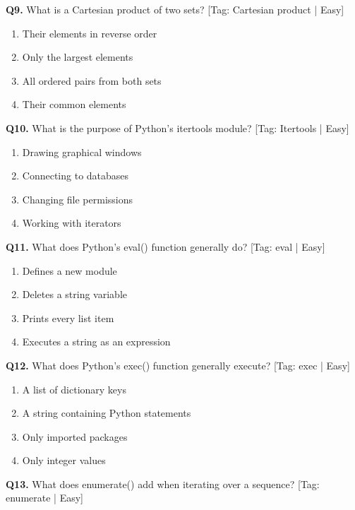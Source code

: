 \noindent\textbf{Q9.} What is a Cartesian product of two sets? \hfill [Tag: Cartesian product | Easy]
\begin{enumerate}[label=(\alph*),topsep=2pt,itemsep=1pt,partopsep=0pt,parsep=0pt]
    \item {Their elements in reverse order}
    \item {Only the largest elements}
    \item {All ordered pairs from both sets}
    \item {Their common elements}
\end{enumerate}
\vspace{2mm}
\noindent\textbf{Q10.} What is the purpose of Python's itertools module? \hfill [Tag: Itertools | Easy]
\begin{enumerate}[label=(\alph*),topsep=2pt,itemsep=1pt,partopsep=0pt,parsep=0pt]
    \item {Drawing graphical windows}
    \item {Connecting to databases}
    \item {Changing file permissions}
    \item {Working with iterators}
\end{enumerate}
\vspace{2mm}
\noindent\textbf{Q11.} What does Python's eval() function generally do? \hfill [Tag: eval | Easy]
\begin{enumerate}[label=(\alph*),topsep=2pt,itemsep=1pt,partopsep=0pt,parsep=0pt]
    \item {Defines a new module}
    \item {Deletes a string variable}
    \item {Prints every list item}
    \item {Executes a string as an expression}
\end{enumerate}
\vspace{2mm}
\noindent\textbf{Q12.} What does Python's exec() function generally execute? \hfill [Tag: exec | Easy]
\begin{enumerate}[label=(\alph*),topsep=2pt,itemsep=1pt,partopsep=0pt,parsep=0pt]
    \item {A list of dictionary keys}
    \item {A string containing Python statements}
    \item {Only imported packages}
    \item {Only integer values}
\end{enumerate}
\vspace{2mm}
\noindent\textbf{Q13.} What does enumerate() add when iterating over a sequence? \hfill [Tag: enumerate | Easy]
